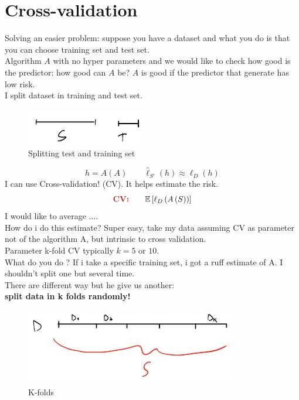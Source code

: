 \documentclass[../main.tex]{subfiles}
\begin{document}
\section{Cross-validation}

Solving an easier problem: suppose you have a dataset and what you do is
that you can choose training set and test set.\\
Algorithm $A$ with no hyper parameters and we would like to check how good is
the predictor: how good can $A$ be? $A$ is good if the predictor that generate has
low risk.\\
I split dataset in training and test set.
\begin{figure}[h]
    \centering
    \includegraphics[width=0.5\linewidth]{../img/lez8-img3.JPG}
    \caption{Splitting test and training set}
\end{figure}
$$
h = A\left(A\right) \qquad \hat{\ell}_{S'}\left(h\right) \approx \ell_D\left(h\right)
$$
I can use Cross-validation! (CV). It helps estimate the risk.
$$
\bred{CV:} \qquad \barra{E}\left[ \ell_D \left(A\left(S \right) \right) \right]
$$
I would like to average .... \\
How do i do this estimate? Super easy, take my data assuming CV as
parameter not of the algorithm A, but intrinsic to cross validation.\\
Parameter k-fold CV typically $k = 5$ or $10$.\\
What do you do ? If i take a specific training set, i got a ruff estimate of A.
I shouldn’t split one but several time.\\
There are different way but he give us another:\\
\textbf{split data in k folds randomly!}
\begin{figure}[h]
    \centering
    \includegraphics[width=0.6\linewidth]{../img/lez8-img4.JPG}
    \caption{K-folds}
\end{figure}\\
\end{document}

